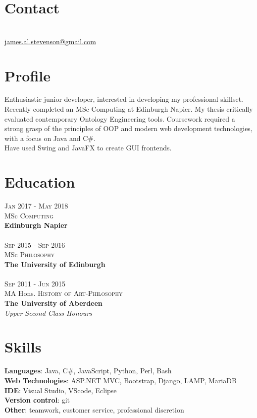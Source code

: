 \documentclass[12pt, a4paper]{article}
\begin{document}
\par{\bigskip\par}
\section{Contact}
\large{}\\
\href{mailto:james.al.stevenson@gmail.com}{james.al.stevenson@gmail.com}\\

\begin{multicols}{2}

\section{Profile}
Enthusiastic junior developer, interested in developing my professional skillset.\\  
Recently completed an MSc Computing at Edinburgh Napier.
My thesis critically evaluated contemporary Ontology Engineering tools.
Coursework required a strong grasp of the principles of OOP and modern web development technologies, with a focus on Java and C\#.\\
Have used Swing and JavaFX to create GUI frontends.

\section{Education}
\textsc{Jan} 2017 - \textsc{May} 2018\\
MSc \textsc{Computing} \\
\textbf{Edinburgh Napier}\\~\\
\textsc{Sep} 2015 - \textsc{Sep} 2016\\
MSc \textsc{Philosophy} \\ 
\textbf{The University of Edinburgh}\\~\\
\textsc{Sep} 2011 - \textsc{Jun} 2015\\
MA Hons. \textsc{History of Art}-\textsc{Philosophy}\\ 
\textbf{The University of Aberdeen}\\ 
\small\emph{Upper Second Class Honours}\\

\section{Skills}
\large{
\textbf{Languages}: Java, C\#, JavaScript, Python, Perl, Bash\\
\textbf{Web Technologies}: ASP.NET MVC, Bootstrap, Django, LAMP, MariaDB\\
\textbf{IDE}: Visual Studio, VScode, Eclipse\\
\textbf{Version control}: git\\
\textbf{Other}: teamwork, customer service, professional discretion\\}


\end{multicols}
\end{document}
